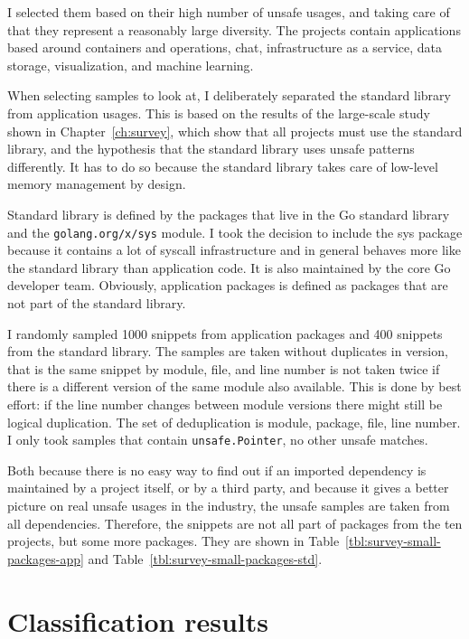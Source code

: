 I selected them based on their high number of unsafe usages, and taking care of that they represent a reasonably large
diversity.
The projects contain applications based around containers and operations, chat, infrastructure as a service, data
storage, visualization, and machine learning.

When selecting samples to look at, I deliberately separated the standard library from application usages.
This is based on the results of the large-scale study shown in Chapter~\ref{ch:survey}, which show that all projects
must use the standard library, and the hypothesis that the standard library uses unsafe patterns differently.
It has to do so because the standard library takes care of low-level memory management by design.

Standard library is defined by the packages that live in the Go standard library and the \texttt{golang.org/x/sys}
module.
I took the decision to include the sys package because it contains a lot of syscall infrastructure and in general
behaves more like the standard library than application code.
It is also maintained by the core Go developer team.
Obviously, application packages is defined as packages that are not part of the standard library.

I randomly sampled 1000 snippets from application packages and 400 snippets from the standard library.
The samples are taken without duplicates in version, that is the same snippet by module, file, and line number is not
taken twice if there is a different version of the same module also available.
This is done by best effort: if the line number changes between module versions there might still be logical
duplication.
The set of deduplication is module, package, file, line number.
I only took samples that contain \texttt{unsafe.Pointer}, no other unsafe matches.

Both because there is no easy way to find out if an imported dependency is maintained by a project itself, or by a
third party, and because it gives a better picture on real unsafe usages in the industry, the unsafe samples are taken
from all dependencies.
Therefore, the snippets are not all part of packages from the ten projects, but some more packages.
They are shown in Table~\ref{tbl:survey-small-packages-app} and Table~\ref{tbl:survey-small-packages-std}.



\section{Classification results}\label{sec:survey-small-classification}

